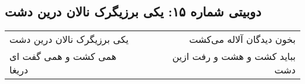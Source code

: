 \begin{center}
\section*{دوبیتی شماره ۱۵: یکی برزیگرک نالان درین دشت}
\label{sec:015}
\begin{longtable}{l p{0.5cm} r}
یکی برزیگرک نالان درین دشت
&&
بخون دیدگان آلاله می‌کشت
\\
همی کشت و همی گفت ای دریغا
&&
بباید کشت و هشت و رفت ازین دشت
\\
\end{longtable}
\end{center}
